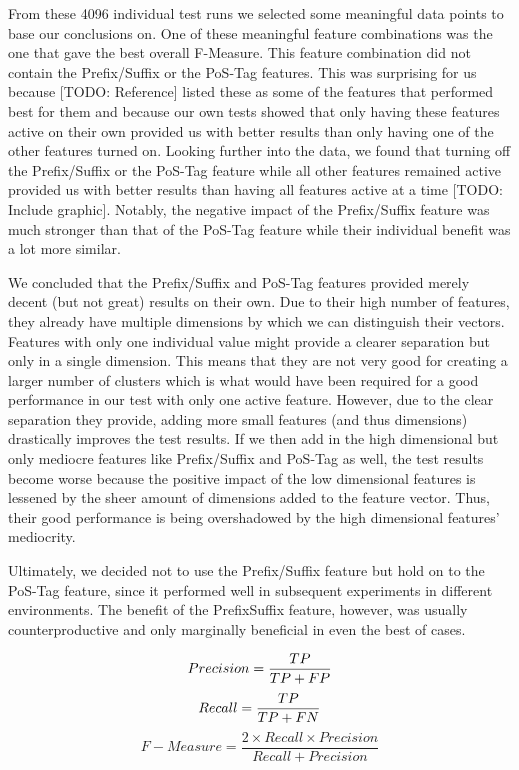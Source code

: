 From these 4096 individual test runs we selected some meaningful data points to base our conclusions on.
One of these meaningful feature combinations was the one that gave the best overall F-Measure.
This feature combination did not contain the Prefix/Suffix or the PoS-Tag features.
This was surprising for us because [TODO: Reference] listed these as some of the features that performed best for them and because our own tests showed that only having these features active on their own provided us with better results than only having one of the other features turned on.
Looking further into the data, we found that turning off the Prefix/Suffix or the PoS-Tag feature while all other features remained active provided us with better results than having all features active at a time [TODO: Include graphic].
Notably, the negative impact of the Prefix/Suffix feature was much stronger than that of the PoS-Tag feature while their individual benefit was a lot more similar.


We concluded that the Prefix/Suffix and PoS-Tag features provided merely decent (but not great) results on their own.
Due to their high number of features, they already have multiple dimensions by which we can distinguish their vectors.
Features with only one individual value might provide a clearer separation but only in a single dimension.
This means that they are not very good for creating a larger number of clusters which is what would have been required for a good performance in our test with only one active feature.
However, due to the clear separation they provide, adding more small features (and thus dimensions) drastically improves the test results.
If we then add in the high dimensional but only mediocre features like Prefix/Suffix and PoS-Tag as well, the test results become worse because the positive impact of the low dimensional features is lessened by the sheer amount of dimensions added to the feature vector.
Thus, their good performance is being overshadowed by the high dimensional features' mediocrity.


Ultimately, we decided not to use the Prefix/Suffix feature but hold on to the PoS-Tag feature, since it performed well in subsequent experiments in different environments.
The benefit of the PrefixSuffix feature, however, was usually counterproductive and only marginally beneficial in even the best of cases.

\begin{equation}
	Precision = \frac{TP}{TP + FP} \\
	\label{eq:precision}
\end{equation}
\begin{equation}
	Recall = \frac{TP}{TP + FN} \\
	\label{eq:recall}
\end{equation}
\begin{equation}
	F-Measure = \frac{2 \times Recall \times Precision}{Recall + Precision}
	\label{eq:fMeasure}
\end{equation}

